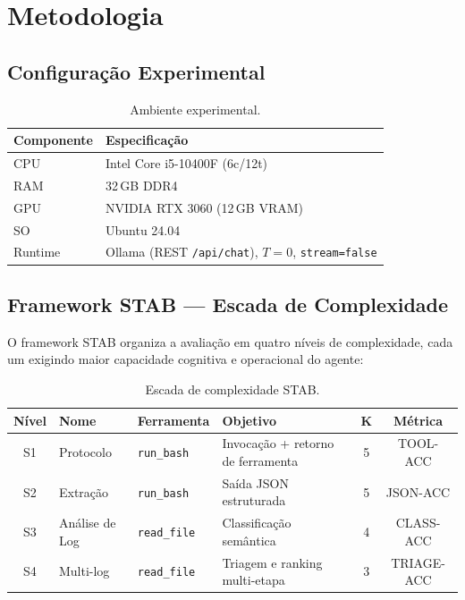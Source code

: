 \documentclass{kdmile}
\begin{document}
\section{Metodologia}
\label{sec:method}

\subsection{Configuração Experimental}

\begin{table}[ht]
\centering
\caption{Ambiente experimental.}
\label{tab:setup}
\begin{tabular}{ll}
\toprule
\textbf{Componente} & \textbf{Especificação} \\
\midrule
CPU     & Intel Core i5-10400F (6c/12t) \\
RAM     & 32\,GB DDR4 \\
GPU     & NVIDIA RTX 3060 (12\,GB VRAM) \\
SO      & Ubuntu 24.04 \\
Runtime & Ollama (REST \texttt{/api/chat}), $T=0$, \texttt{stream=false} \\
\bottomrule
\end{tabular}
\end{table}

\subsection{Framework STAB — Escada de Complexidade}

O framework STAB organiza a avaliação em quatro níveis de complexidade, cada
um exigindo maior capacidade cognitiva e operacional do agente:

\begin{table}[ht]
\centering
\caption{Escada de complexidade STAB.}
\label{tab:stab}
\begin{tabular}{clllcc}
\toprule
\textbf{Nível} & \textbf{Nome} & \textbf{Ferramenta} & \textbf{Objetivo} & \textbf{K} & \textbf{Métrica} \\
\midrule
S1 & Protocolo     & \texttt{run\_bash}  & Invocação + retorno de ferramenta & 5 & TOOL-ACC \\
S2 & Extração      & \texttt{run\_bash}  & Saída JSON estruturada            & 5 & JSON-ACC \\
S3 & Análise de Log& \texttt{read\_file} & Classificação semântica           & 4 & CLASS-ACC \\
S4 & Multi-log     & \texttt{read\_file} & Triagem e ranking multi-etapa     & 3 & TRIAGE-ACC \\
\bottomrule
\end{tabular}
\end{table}
\end{document}
